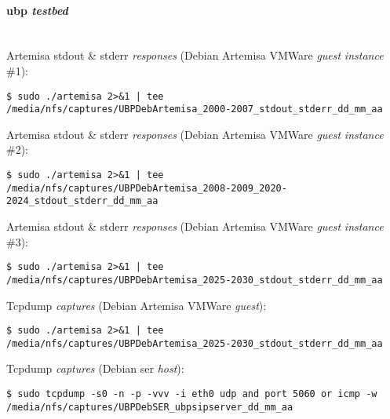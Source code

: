 \documentclass[a4paper,12pt]{report}
\newenvironment{myscriptlisting}
{\begin{list}{}{\setlength{\leftmargin}{1em}}\item\scriptsize\bfseries}
{\end{list}}
\begin{document}
\paragraph{\ac{ubp} \emph{testbed} \\ \\} 
Artemisa \ac{stdout} \& \ac{stderr} \emph{responses} (Debian Artemisa VMWare
\emph{guest} \emph{instance} \#1):
\begin{myscriptlisting}   
  \begin{verbatim}
$ sudo ./artemisa 2>&1 | tee
/media/nfs/captures/UBPDebArtemisa_2000-2007_stdout_stderr_dd_mm_aa
  \end{verbatim}
\end{myscriptlisting}

Artemisa \ac{stdout} \& \ac{stderr} \emph{responses} (Debian Artemisa VMWare
\emph{guest} \emph{instance} \#2):
\begin{myscriptlisting}   
  \begin{verbatim}
$ sudo ./artemisa 2>&1 | tee
/media/nfs/captures/UBPDebArtemisa_2008-2009_2020-2024_stdout_stderr_dd_mm_aa
  \end{verbatim}
\end{myscriptlisting}

Artemisa \ac{stdout} \& \ac{stderr} \emph{responses} (Debian Artemisa VMWare
\emph{guest} \emph{instance} \#3):
\begin{myscriptlisting}   
  \begin{verbatim}
$ sudo ./artemisa 2>&1 | tee
/media/nfs/captures/UBPDebArtemisa_2025-2030_stdout_stderr_dd_mm_aa
  \end{verbatim}
\end{myscriptlisting}

Tcpdump \emph{captures} (Debian Artemisa VMWare \emph{guest}):
\begin{myscriptlisting}   
  \begin{verbatim}
$ sudo ./artemisa 2>&1 | tee
/media/nfs/captures/UBPDebArtemisa_2025-2030_stdout_stderr_dd_mm_aa
  \end{verbatim}
\end{myscriptlisting}

Tcpdump \emph{captures} (Debian \ac{ser} \emph{host}):
\begin{myscriptlisting}   
  \begin{verbatim}
$ sudo tcpdump -s0 -n -p -vvv -i eth0 udp and port 5060 or icmp -w
/media/nfs/captures/UBPDebSER_ubpsipserver_dd_mm_aa
  \end{verbatim}
\end{myscriptlisting}
\end{document}

